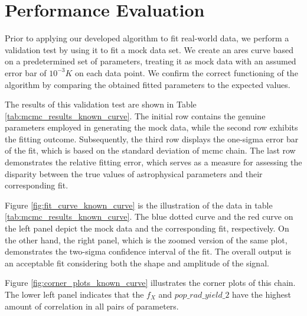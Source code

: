 \documentclass[%
 reprint,
 amsmath,amssymb,
 aps,
]{revtex4-2}
\begin{document}
\section{Performance Evaluation}
\label{sec:evaluation}
Prior to applying our developed algorithm to fit real-world data, we perform a validation test by using it to fit a mock data set. We create an \gls{ares} curve based on a predetermined set of parameters, treating it as mock data with an assumed error bar of $10^{-3}K$ on each data point. We confirm the correct functioning of the algorithm by comparing the obtained fitted parameters to the expected values.\par
The results of this validation test are shown in Table \ref{tab:mcmc_results_known_curve}. The initial row contains the genuine parameters employed in generating the mock data, while the second row exhibits the fitting outcome. Subsequently, the third row displays the one-sigma error bar of the fit, which is based on the standard deviation of \gls{mcmc} chain. The last row demonstrates the relative fitting error, which serves as a measure for assessing the disparity between the true values of astrophysical parameters and their corresponding fit.\par 
Figure \ref{fig:fit_curve_known_curve} is the illustration of the data in table \ref{tab:mcmc_results_known_curve}. 
The blue dotted curve and the red curve on the left panel depict the mock data and the corresponding fit, respectively.
On the other hand, the right panel, which is the zoomed version of the same plot, demonstrates the two-sigma confidence interval of the fit. The overall output is an acceptable fit considering both the shape and amplitude of the signal.\par
Figure \ref{fig:corner_plots_known_curve} illustrates the corner plots of this chain. The lower left panel indicates that the $f_X$ and $pop\_rad\_ yield\_2$ have the highest amount of correlation in all pairs of parameters.\par
\end{document}
